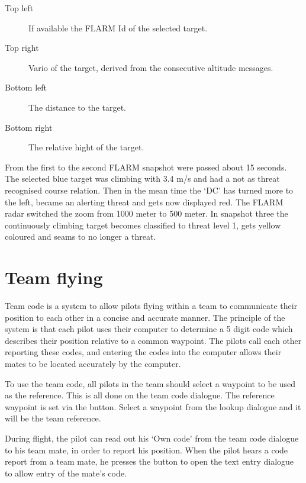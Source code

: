 \begin{description}
\item[Top left]  If available the FLARM Id of the selected target. 
\item[Top right]  Vario of the target, derived from the consecutive altitude
messages.
\item[Bottom left]  The distance to the target.
\item[Bottom right]  The relative hight of the target. 
\end{description}

From the first to the second FLARM snapshot were passed about 15 seconds. The
selected blue target was climbing with 3.4 m/s and had a not as threat
recognised course relation.  Then in the mean time the `DC' has turned more to
the left, became an alerting threat and gets now displayed red.  The FLARM
radar switched the zoom from 1000 meter to 500 meter. In snapshot three the
continuously climbing target becomes classified to threat level 1, gets yellow 
coloured and seams to no longer a threat.


\section{Team flying}\label{sec:team-flying}

Team code is a system to allow pilots flying within a team to 
communicate their position to each other in a concise and accurate 
manner.  The principle of the system is that each pilot uses their 
computer to determine a 5 digit code which describes their position 
relative to a common waypoint.  The pilots call each other reporting 
these codes, and entering the codes into the computer allows their 
mates to be located accurately by the computer. 

To use the team code, all pilots in the team should select a waypoint to 
be used as the reference.  This is all done on the team code dialogue. 
The reference waypoint is set 
via the  button. Select a waypoint from the lookup dialogue 
and it will be the team reference.

During flight, the pilot can read out his `Own code' from the team 
code dialogue to his team mate, in order to report his position.  When 
the pilot hears a code report from a team mate, he presses the  
button to open the text entry dialogue to allow entry of the mate's code.

